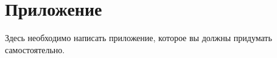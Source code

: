 \section*{Приложение}
\label{sec:Apendix} 

Здесь необходимо написать приложение, которое вы должны придумать самостоятельно.
